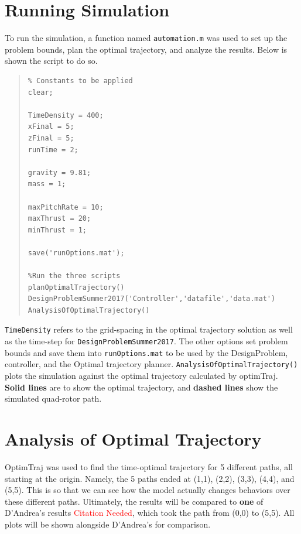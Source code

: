 \documentclass[12pt]{article}
\begin{document}
\section{Running Simulation}

To run the simulation, a function named \lstinline!automation.m! was used to set up the problem bounds, plan the optimal trajectory, and analyze the results. Below is shown the script to do so.
\begin{quote}
\begin{lstlisting}
% Constants to be applied
clear; 

TimeDensity = 400;
xFinal = 5;
zFinal = 5;
runTime = 2;

gravity = 9.81;
mass = 1;

maxPitchRate = 10;
maxThrust = 20;
minThrust = 1;

save('runOptions.mat');

%Run the three scripts
planOptimalTrajectory()
DesignProblemSummer2017('Controller','datafile','data.mat')
AnalysisOfOptimalTrajectory()

\end{lstlisting}
\end{quote}
\lstinline!TimeDensity! refers to the grid-spacing in the optimal trajectory solution as well as the time-step for \lstinline!DesignProblemSummer2017!. The other options set problem bounds and save them into \lstinline!runOptions.mat! to be used by the DesignProblem, controller, and the Optimal trajectory planner. 
\newline
\newline
\lstinline!AnalysisOfOptimalTrajectory()! plots the simulation against the optimal trajectory calculated by optimTraj. \textbf{Solid lines} are to show the optimal trajectory, and \textbf{dashed lines} show the simulated quad-rotor path.
\section{Analysis of Optimal Trajectory}

OptimTraj  was used to find the time-optimal trajectory for 5 different paths, all starting at the origin. 
Namely, the 5 paths ended at (1,1), (2,2), (3,3), (4,4), and (5,5). This is so that we can see how the model actually changes behaviors over these different paths. Ultimately, the results will be compared to \textbf{one} of D'Andrea's results \textcolor{red}{Citation Needed}, which took the path from (0,0) to (5,5).  All plots will be shown alongside D'Andrea's for comparison. 
\end{document}
